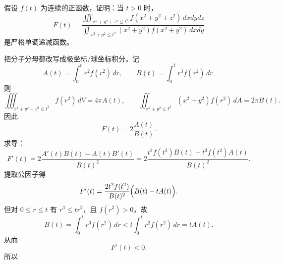 \begin{question}[单调性证明]

假设 $f(t)$ 为连续的正函数，证明：当 $t>0$ 时，
\[
F(t)=
\frac{\iiint_{x^2+y^2+z^2\le t^2}f(x^2+y^2+z^2)\,dxdydz}
{\iint_{x^2+y^2\le t^2}(x^2+y^2)f(x^2+y^2)\,dxdy}
\]
是严格单调递减函数。

\begin{solution}

把分子分母都改写成极坐标/球坐标积分。记
\[
 A(t)=\int_0^t r^2 f(r^2)\,dr,
 \qquad
 B(t)=\int_0^t r^3 f(r^2)\,dr.
\]
则
\[
\iiint_{x^2+y^2+z^2\le t^2}f(r^2)\,dV=4\pi A(t),
\qquad
\iint_{x^2+y^2\le t^2}(x^2+y^2)f(r^2)\,dA=2\pi B(t).
\]
因此
\[
 F(t)=2\frac{A(t)}{B(t)}.
\]
求导：
\[
 F'(t)=2\frac{A'(t)B(t)-A(t)B'(t)}{B(t)^2}
 =2\frac{t^2f(t^2)B(t)-t^3f(t^2)A(t)}{B(t)^2}.
\]
提取公因子得
\[
 F'(t)=\frac{2t^2f(t^2)}{B(t)^2}\Bigl(B(t)-tA(t)\Bigr).
\]
但对 $0\le r\le t$ 有 $r^3\le tr^2$，且 $f(r^2)>0$，故
\[
 B(t)=\int_0^t r^3f(r^2)\,dr
< t\int_0^t r^2f(r^2)\,dr=tA(t).
\]
从而
\[
 F'(t)<0.
\]
所以

\end{solution}
\end{question}

